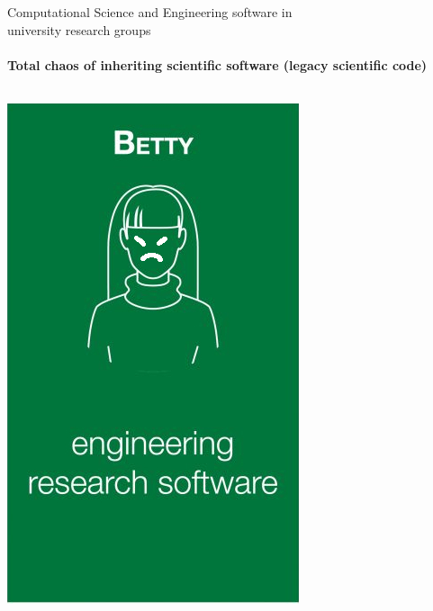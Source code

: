 \begin{frame}{Computational Science and Engineering software in\\university research groups}
    \framesubtitle{Total chaos of inheriting scientific software (legacy scientific code)}
        \vfill
	
    \begin{columns}
        \begin{column}[c]{0.2\textwidth}
            \begin{center}
            \includegraphics[width=\textwidth]{figures/betty.jpg}

\end{center}
\end{column}
\end{columns}
\end{frame}
